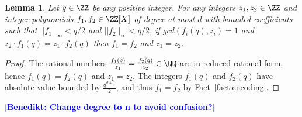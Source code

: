 \documentclass{article}
\theoremstyle{Definition}
\newtheorem{lemma}{Lemma}
\newtheorem{fact}{Fact}
\newcommand{\benedikt}[1]{{\textcolor{blue}{[\bf Benedikt: #1]}}}
\begin{document}
\begin{lemma}
\label{lem:encoding}
Let $q \in \Z$ be any positive integer. For any integers $z_1, z_2 \in \ZZ$ and integer polynomials $f_1, f_2 \in \ZZ[X]$ of degree at most $d$ with bounded coefficients such that $||f_1||_\infty < q/2$ and $||f_2||_\infty < q/2$, if $gcd(f_i(q), z_i) = 1$ and $z_2 \cdot f_1(q) = z_1 \cdot f_2(q)$ then 
$f_1 = f_2$ and $z_1 = z_2$. 
\end{lemma}
\begin{proof}
The rational numbers $\frac{f_1(q)}{z_1} = \frac{f_2(q)}{z_2} \in \QQ$ are in reduced rational form, hence $f_1(q) = f_2(q)$ and $z_1 = z_2$. The integers $f_1(q)$ and $f_2(q)$ have absolute value bounded by $\frac{q^{d+1}}{2}$, and thus $f_1 = f_2$ by Fact~\ref{fact:encoding}.
\end{proof}

\benedikt{Change degree to n to avoid confusion?}



	
		
\end{document}
